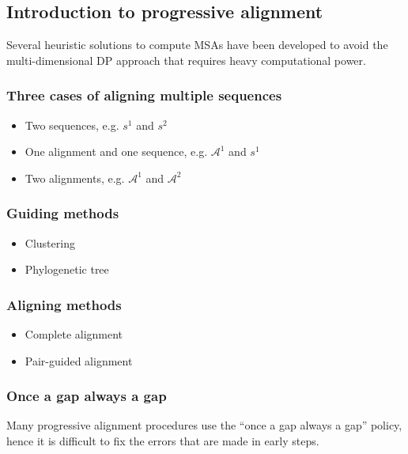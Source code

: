 %
%

%
%
\subsection{Introduction to progressive alignment}
Several heuristic solutions to compute MSAs have been developed to avoid the multi-dimensional DP approach that requires heavy computational power.

%
%
\subsubsection*{Three cases of aligning multiple sequences}
\begin{itemize}
\item Two sequences, e.g. $s^1$ and $s^2$
\item One alignment and one sequence, e.g. $\mathcal{A}^1$ and $s^1$
\item Two alignments, e.g. $\mathcal{A}^1$ and $\mathcal{A}^2$
\end{itemize}

%
%
\subsubsection*{Guiding methods}
\begin{itemize}
\item Clustering
\item Phylogenetic tree
\end{itemize}

%
%
\subsubsection*{Aligning methods}
\begin{itemize}
\item Complete alignment
\item Pair-guided alignment
\end{itemize}

%
%
\subsubsection*{Once a gap always a gap}
Many progressive alignment procedures use the “once a gap always a gap” policy, hence it is difficult to fix the errors that are made in early steps.

\bigskip 

%
